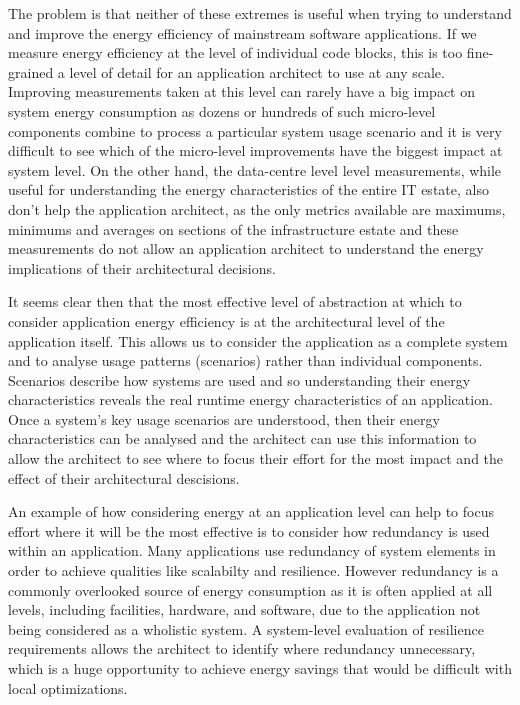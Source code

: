 The problem is that neither of these extremes is useful when trying to understand and improve the energy efficiency of mainstream software applications.  If we measure energy efficiency at the level of individual code blocks, this is too fine-grained a level of detail for an application architect to use at any scale.  Improving measurements taken at this level can rarely have a big impact on system energy consumption as dozens or hundreds of such micro-level components combine to process a particular system usage scenario and it is very difficult to see which of the micro-level improvements have the biggest impact at system level.  On the other hand, the data-centre level level measurements, while useful for understanding the energy characteristics of the entire IT estate, also don't help the application architect, as the only metrics available are maximums, minimums and averages on sections of the infrastructure estate and these measurements do not allow an application architect to understand the energy implications of their architectural decisions.

It seems clear then that the most effective level of abstraction at which to consider application energy efficiency is at the architectural level of the application itself.  This allows us to consider the application as a complete system and to analyse usage patterns (scenarios) rather than individual components.  Scenarios describe how systems are used and so understanding their energy characteristics reveals the real runtime energy characteristics of an application.  Once a system's key usage scenarios are understood, then their energy characteristics can be analysed and the architect can use this information to allow the architect to see where to focus their effort for the most impact and the effect of their architectural descisions.

An example of how considering energy at an application level can help to focus effort where it will be the most effective is to consider how redundancy is used within an application.  Many applications use redundancy of system elements in order to achieve qualities like scalabilty and resilience.  However redundancy is a commonly overlooked source of energy consumption as it is often applied at all levels, including facilities, hardware, and software, due to the application not being considered as a wholistic system.   A system-level evaluation of resilience requirements allows the architect to identify where redundancy unnecessary, which is a huge opportunity to achieve energy savings that would be difficult with local optimizations.

